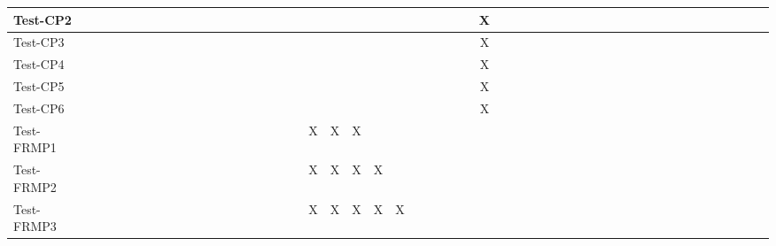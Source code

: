 \documentclass[12pt, titlepage]{article}
\begin{document}
\begin{landscape}
\begin{table}[H]
\begin{adjustwidth}{-0.1in}{-1in}
{\begin{tabular}{c|c|c|c|c|c|c|c|c|c|c|c|c|c|c|c|c|c|c|c|c|c|c|c|c|c|c|c|c|c|c|c|c|c|c|c|c|c|c|c|c|c|c|c|c|c|c|c|c|c|c|c|}
\multicolumn{1}{|l|}{{Test-CP2}}  &             &              &             &              &             &             &             &             &              &              &             &             &              &             &              &            &&&&&&&&&&&&&X&&&&&&&&&&&&&&&&&&&&&& \\ \hline
\multicolumn{1}{|l|}{{Test-CP3}}  &             &              &             &              &             &             &             &             &              &              &             &             &              &             &              &            &&&&&&&&&&&&&X&&&&&&&&&&&&&&&&&&&&&&  \\ \hline
\multicolumn{1}{|l|}{{Test-CP4}}  &             &              &             &              &             &             &             &             &              &              &             &             &              &             &              &            &&&&&&&&&&&&&X&&&&&&&&&&&&&&&&&&&&&&  \\ \hline
\multicolumn{1}{|l|}{{Test-CP5}}  &             &              &             &              &             &             &             &             &              &              &             &             &              &             &              &            &&&&&&&&&&&&&X&&&&&&&&&&&&&&&&&&&&&& \\ \hline
\multicolumn{1}{|l|}{{Test-CP6}}  &             &              &             &              &             &             &             &             &              &              &             &             &              &             &              &            &&&&&&&&&&&&&X&&&&&&&&&&&&&&&&&&&&&& \\ \hline
\multicolumn{1}{|l|}{{Test-FRMP1}}  &             &              &             &              &             &             &             &             &              &              &             &             &              &             &              &             &&&X&X&X&&&&&&&&&&&&&&&&&&&&&&&&&&&&&&  \\ \hline
\multicolumn{1}{|l|}{{Test-FRMP2}}  &             &             &             &              &            &             &             &             &              &              &             &             &              &             &              &               &&&X&X&X&X&&&&&&&&&&&&&&&&&&&&&&&&&&&&&  \\ \hline
\multicolumn{1}{|l|}{{Test-FRMP3}}  &             &              &             &              &             &             &             &             &              &              &             &             &              &             &              &             &&&X&X&X&X&X&&&&&&&&&&&&&&&&&&&&&&&&&&&&  \\ \hline

\end{tabular}}
\end{adjustwidth}
\end{table}
\end{landscape}
\end{document}
